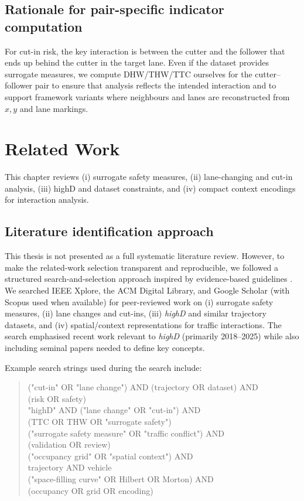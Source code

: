 \documentclass[12pt,a4paper,twoside,openright]{report}
\begin{document}
    \section{Rationale for pair-specific indicator computation}
    For cut-in risk, the key interaction is between the cutter and the follower that ends up behind the cutter in the target lane. Even if the dataset provides surrogate measures, we compute DHW/THW/TTC ourselves for the cutter--follower pair to ensure that analysis reflects the intended interaction and to support framework variants where neighbours and lanes are reconstructed from $x,y$ and lane markings.

    \chapter{Related Work}
    \label{chap:relatedwork}

    This chapter reviews (i) surrogate safety measures, (ii) lane-changing and cut-in analysis, (iii) highD and dataset constraints, and (iv) compact context encodings for interaction analysis.

    \section{Literature identification approach}
    This thesis is not presented as a full systematic literature review. However, to make the related-work selection transparent and reproducible, we followed a structured search-and-selection approach inspired by evidence-based guidelines \cite{kitchenham2007,wohlin2014}. We searched IEEE Xplore, the ACM Digital Library, and Google Scholar (with Scopus used when available) for peer-reviewed work on (i) surrogate safety measures, (ii) lane changes and cut-ins, (iii) \textit{highD} and similar trajectory datasets, and (iv) spatial/context representations for traffic interactions. The search emphasised recent work relevant to \textit{highD} (primarily 2018--2025) while also including seminal papers needed to define key concepts.

    Example search strings used during the search include:
    \begin{quote}\small\ttfamily\raggedright
    ("cut-in" OR "lane change") AND (trajectory OR dataset) AND\\
    (risk OR safety)\\[2pt]
        "highD" AND ("lane change" OR "cut-in") AND\\
        (TTC OR THW OR "surrogate safety")\\[2pt]
        ("surrogate safety measure" OR "traffic conflict") AND\\
        (validation OR review)\\[2pt]
        ("occupancy grid" OR "spatial context") AND\\
        trajectory AND vehicle\\[2pt]
        ("space-filling curve" OR Hilbert OR Morton) AND\\
        (occupancy OR grid OR encoding)
    \end{quote}
\end{document}
